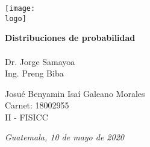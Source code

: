 
\def\title{ %
	Distribuciones de probabilidad
}
\def\logo{logo} %
\def\date{ %
	Guatemala, 10 de mayo de 2020
}
\def\subtitle{ %
	Dr. Jorge Samayoa\\
	Ing. Preng Biba
}
\def\profile{ %
	Josu\'e Benyamin Isa\'i Galeano Morales\\
	Carnet: 18002955\\
	II - FISICC
}

\begin{titlepage}
	\vspace*{-1.5cm}
	\begin{flushleft}
		\texttt{[image: \\logo]}
	\end{flushleft}
	\vspace*{\fill}
	\begin{center}
		\textbf{\Huge \title} \\ %
		\vspace{.3in}
		{\huge \docOwner}\\
		\vspace{.2in}
		{\Large \subtitle}
	\end{center}
	\vspace*{\fill}
	
	\begin{flushright}
		\large
		\profile
	\end{flushright}
	\begin{center}
		\emph{\date}
	\end{center}
\end{titlepage}